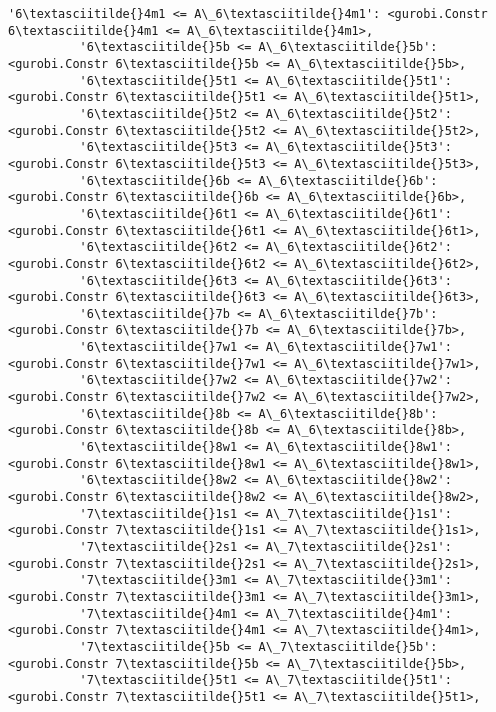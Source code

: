 \documentclass[11pt]{article}
\begin{document}
\begin{Verbatim}[commandchars=\\\{\}]
          '6\textasciitilde{}4m1 <= A\_6\textasciitilde{}4m1': <gurobi.Constr 6\textasciitilde{}4m1 <= A\_6\textasciitilde{}4m1>,
          '6\textasciitilde{}5b <= A\_6\textasciitilde{}5b': <gurobi.Constr 6\textasciitilde{}5b <= A\_6\textasciitilde{}5b>,
          '6\textasciitilde{}5t1 <= A\_6\textasciitilde{}5t1': <gurobi.Constr 6\textasciitilde{}5t1 <= A\_6\textasciitilde{}5t1>,
          '6\textasciitilde{}5t2 <= A\_6\textasciitilde{}5t2': <gurobi.Constr 6\textasciitilde{}5t2 <= A\_6\textasciitilde{}5t2>,
          '6\textasciitilde{}5t3 <= A\_6\textasciitilde{}5t3': <gurobi.Constr 6\textasciitilde{}5t3 <= A\_6\textasciitilde{}5t3>,
          '6\textasciitilde{}6b <= A\_6\textasciitilde{}6b': <gurobi.Constr 6\textasciitilde{}6b <= A\_6\textasciitilde{}6b>,
          '6\textasciitilde{}6t1 <= A\_6\textasciitilde{}6t1': <gurobi.Constr 6\textasciitilde{}6t1 <= A\_6\textasciitilde{}6t1>,
          '6\textasciitilde{}6t2 <= A\_6\textasciitilde{}6t2': <gurobi.Constr 6\textasciitilde{}6t2 <= A\_6\textasciitilde{}6t2>,
          '6\textasciitilde{}6t3 <= A\_6\textasciitilde{}6t3': <gurobi.Constr 6\textasciitilde{}6t3 <= A\_6\textasciitilde{}6t3>,
          '6\textasciitilde{}7b <= A\_6\textasciitilde{}7b': <gurobi.Constr 6\textasciitilde{}7b <= A\_6\textasciitilde{}7b>,
          '6\textasciitilde{}7w1 <= A\_6\textasciitilde{}7w1': <gurobi.Constr 6\textasciitilde{}7w1 <= A\_6\textasciitilde{}7w1>,
          '6\textasciitilde{}7w2 <= A\_6\textasciitilde{}7w2': <gurobi.Constr 6\textasciitilde{}7w2 <= A\_6\textasciitilde{}7w2>,
          '6\textasciitilde{}8b <= A\_6\textasciitilde{}8b': <gurobi.Constr 6\textasciitilde{}8b <= A\_6\textasciitilde{}8b>,
          '6\textasciitilde{}8w1 <= A\_6\textasciitilde{}8w1': <gurobi.Constr 6\textasciitilde{}8w1 <= A\_6\textasciitilde{}8w1>,
          '6\textasciitilde{}8w2 <= A\_6\textasciitilde{}8w2': <gurobi.Constr 6\textasciitilde{}8w2 <= A\_6\textasciitilde{}8w2>,
          '7\textasciitilde{}1s1 <= A\_7\textasciitilde{}1s1': <gurobi.Constr 7\textasciitilde{}1s1 <= A\_7\textasciitilde{}1s1>,
          '7\textasciitilde{}2s1 <= A\_7\textasciitilde{}2s1': <gurobi.Constr 7\textasciitilde{}2s1 <= A\_7\textasciitilde{}2s1>,
          '7\textasciitilde{}3m1 <= A\_7\textasciitilde{}3m1': <gurobi.Constr 7\textasciitilde{}3m1 <= A\_7\textasciitilde{}3m1>,
          '7\textasciitilde{}4m1 <= A\_7\textasciitilde{}4m1': <gurobi.Constr 7\textasciitilde{}4m1 <= A\_7\textasciitilde{}4m1>,
          '7\textasciitilde{}5b <= A\_7\textasciitilde{}5b': <gurobi.Constr 7\textasciitilde{}5b <= A\_7\textasciitilde{}5b>,
          '7\textasciitilde{}5t1 <= A\_7\textasciitilde{}5t1': <gurobi.Constr 7\textasciitilde{}5t1 <= A\_7\textasciitilde{}5t1>,

\end{Verbatim}
\end{document}
